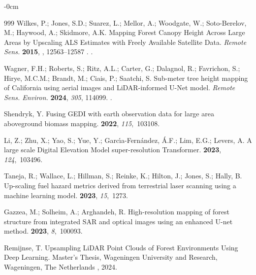 \documentclass[remotesensing,article,accept,pdftex,moreauthors]{Definitions/mdpi}
\begin{document}
\begin{adjustwidth}{-\extralength}{0cm}
\begin{thebibliography}{999}
Wilkes, P.; Jones, S.D.; Suarez, L.; Mellor, A.; Woodgate, W.; Soto-Berelov,
  M.; Haywood, A.; Skidmore, A.K.
\newblock Mapping Forest Canopy Height Across Large Areas by Upscaling {ALS}
  Estimates with Freely Available Satellite Data. \emph{Remote Sens.
} {\bf 2015},
, 12563--12587
.
.

Wagner, F.H.; Roberts, S.; Ritz, A.L.; Carter, G.; Dalagnol, R.; Favrichon, S.;
  Hirye, M.C.M.; Brandt, M.; Ciais, P.; Saatchi, S.
\newblock Sub-meter tree height mapping of California using aerial images and
  {LiDAR}-informed U-Net model. \emph{Remote Sens. Environ.} {\bf 2024}, {\em 305}, 114099.
.

Shendryk, Y.
\newblock Fusing GEDI with earth observation data for large area aboveground
  biomass mapping.
 {\bf 2022}, {\em 115},~103108.

Li, Z.; Zhu, X.; Yao, S.; Yue, Y.; Garc{\'\i}a-Fern{\'a}ndez, {\'A}.F.; Lim,
  E.G.; Levers, A.
\newblock A large scale Digital Elevation Model super-resolution Transformer.
 {\bf 2023}, {\em 124},~103496.

Taneja, R.; Wallace, L.; Hillman, S.; Reinke, K.; Hilton, J.; Jones, S.; Hally,
  B.
\newblock Up-scaling fuel hazard metrics derived from terrestrial laser
  scanning using a machine learning model.
 {\bf 2023}, {\em 15},~1273.

Gazzea, M.; Solheim, A.; Arghandeh, R.
\newblock High-resolution mapping of forest structure from integrated SAR and
  optical images using an enhanced U-net method.
 {\bf 2023}, {\em 8},~100093.

Remijnse, T.
\newblock Upsampling LiDAR Point Clouds of Forest Environments Using Deep Learning. Master's Thesis, Wageningen University and Research, Wageningen, The Netherlands
, 2024.


\end{thebibliography}
\end{adjustwidth}
\end{document}
